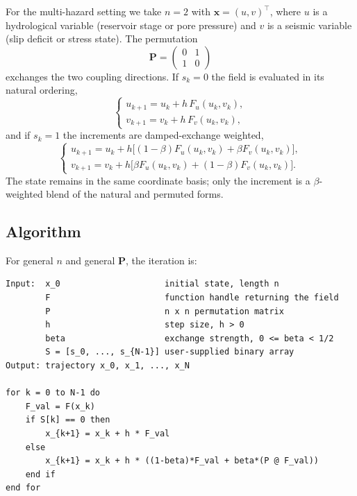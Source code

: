 \documentclass[12pt, a4paper]{article}
\theoremstyle{plain}
\theoremstyle{definition}
\theoremstyle{remark}
\newcommand{\bx}{\mathbf{x}}
\newcommand{\bP}{\mathbf{P}}
\begin{document}
For the multi-hazard setting we take $n=2$ with $\bx = (u,v)^\top$, where $u$
is a hydrological variable (reservoir stage or pore pressure) and $v$ is a
seismic variable (slip deficit or stress state). The permutation
\begin{equation}
\bP = \begin{pmatrix} 0 & 1 \\ 1 & 0 \end{pmatrix}
\end{equation}
exchanges the two coupling directions. If $s_k = 0$ the field is evaluated in
its natural ordering,
\begin{equation}
\begin{cases}
u_{k+1} = u_k + h\,F_u(u_k,v_k), \\[2pt]
v_{k+1} = v_k + h\,F_v(u_k,v_k),
\end{cases}
\label{eq:unswapped}
\end{equation}
and if $s_k = 1$ the increments are damped-exchange weighted,
\begin{equation}
\begin{cases}
u_{k+1} = u_k + h\big[(1-\beta)F_u(u_k,v_k) + \beta F_v(u_k,v_k)\big], \\[2pt]
v_{k+1} = v_k + h\big[\beta F_u(u_k,v_k) + (1-\beta)F_v(u_k,v_k)\big].
\end{cases}
\label{eq:swapped}
\end{equation}
The state remains in the same coordinate basis; only the increment is a
$\beta$-weighted blend of the natural and permuted forms.

\subsection{Algorithm}

For general $n$ and general $\bP$, the iteration is:

\begin{verbatim}
Input:  x_0                     initial state, length n
        F                       function handle returning the field
        P                       n x n permutation matrix
        h                       step size, h > 0
        beta                    exchange strength, 0 <= beta < 1/2
        S = [s_0, ..., s_{N-1}] user-supplied binary array
Output: trajectory x_0, x_1, ..., x_N

for k = 0 to N-1 do
    F_val = F(x_k)
    if S[k] == 0 then
        x_{k+1} = x_k + h * F_val
    else
        x_{k+1} = x_k + h * ((1-beta)*F_val + beta*(P @ F_val))
    end if
end for
\end{verbatim}
\end{document}
